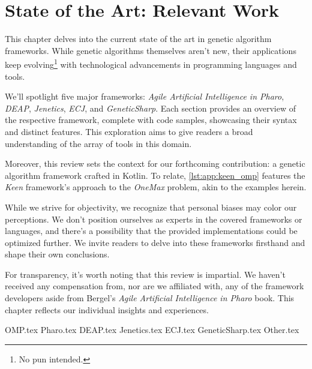 \chapter{State of the Art: Relevant Work}
\label{chap:sota}
  This chapter delves into the current state of the art in genetic algorithm 
  frameworks.
  While genetic algorithms themselves aren't new, their applications keep 
  evolving\footnote{No pun intended.} with technological advancements in 
  programming languages and tools.

  We'll spotlight five major frameworks: \emph{Agile Artificial Intelligence in 
  Pharo}, \emph{DEAP}, \emph{Jenetics}, \emph{ECJ}, and \emph{GeneticSharp}.
  Each section provides an overview of the respective framework, complete with 
  code samples, showcasing their syntax and distinct features.
  This exploration aims to give readers a broad understanding of the array of 
  tools in this domain.

  Moreover, this review sets the context for our forthcoming contribution: a 
  genetic algorithm framework crafted in Kotlin.
  To relate, \vref{lst:app:keen_omp} features the \emph{Keen} framework's 
  approach to the \emph{OneMax} problem, akin to the examples herein.

  While we strive for objectivity, we recognize that personal biases may color 
  our perceptions.
  We don't position ourselves as experts in the covered frameworks or languages, 
  and there's a possibility that the provided implementations could be optimized 
  further.
  We invite readers to delve into these frameworks firsthand and shape their own 
  conclusions.

  For transparency, it's worth noting that this review is impartial.
  We haven't received any compensation from, nor are we affiliated with, any of 
  the framework developers aside from Bergel's \emph{Agile Artificial 
  Intelligence in Pharo} book.
  This chapter reflects our individual insights and experiences.

  {OMP.tex}
  {Pharo.tex}
  {DEAP.tex}
  {Jenetics.tex}
  {ECJ.tex}
  {GeneticSharp.tex}
  {Other.tex}
